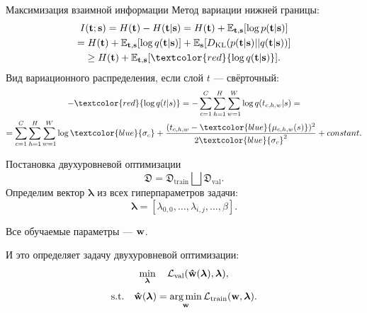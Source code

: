 \documentclass{beamer}
\newcommand{\blambda}{\boldsymbol{\lambda}}
\DeclareMathOperator*{\argmin}{arg\,min}
\begin{document}
\begin{frame}{Максимизация взаимной информации}
    Метод вариации нижней границы:
    \begin{multline}
        I(\bold{t}; \bold{s}) = H(\bold{t}) - H(\bold{t} | \bold{s}) =  H(\bold{t}) + \mathbb{E}_{\bold{t},\bold{s}}[\log{p(\bold{t}|\bold{s})}] \\
        = H(\bold{t}) + \mathbb{E}_{\bold{t},\bold{s}}[\log{q(\bold{t}|\bold{s})}] + \mathbb{E}_{\bold{s}}[D_{\text{KL}}(p(\bold{t}|\bold{s})||q(\bold{t}|\bold{s}))] \\
        \geq H(\bold{t}) + \mathbb{E}_{\bold{t},\bold{s}}[\textcolor{red}{\log{q(\bold{t}|\bold{s})}}].
    \end{multline}
    Вид вариационного распределения, если слой $t$ --- свёрточный:
    \begin{multline}
        -\textcolor{red}{\log{q(t|s)}} = -\sum_{c=1}^{C}  \sum_{h=1}^{H} \sum_{w=1}^{W} \log{q(t_{c,h,w}|s)} = \\
        = \sum_{c=1}^{C}  \sum_{h=1}^{H} \sum_{w=1}^{W} \log{\textcolor{blue}{\sigma_c}} + \frac{(t_{c,h,w} - \textcolor{blue}{\mu_{c,h,w}(s)})^2}{2\textcolor{blue}{\sigma_c}^2} + constant.
    \end{multline}
\end{frame}


\begin{frame}{Постановка двухуровневой оптимизации}
    $$\mathfrak{D} = \mathfrak{D}_\text{train} \bigsqcup \mathfrak{D}_\text{val}.$$
    Определим вектор $\blambda$ из всех гиперпараметров задачи:
    $$\blambda = [\lambda_{0, 0}, \ldots, \lambda_{i, j}, \ldots, \beta].$$

    Все обучаемые параметры --- $\bold{w}$.

    И это определяет задачу двухуровневой оптимизации:
    $$\min_{\blambda} \quad \mathcal{L}_\text{val}(\bold{\hat{w}}(\blambda), \blambda),$$
    $$\text{s.t.} \quad  \bold{\hat{w}}(\blambda) = \argmin_{\bold{w}}{\mathcal{L}_\text{train}(\bold{w}, \blambda)}. $$

\end{frame}

\end{document}
